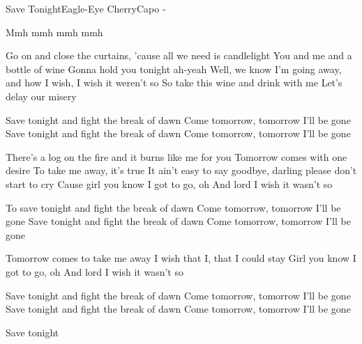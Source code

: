 \begin{song}{Save Tonight}{Eagle-Eye Cherry}{Capo -}

Mmh   mmh   mmh   mmh

Go on and close the curtains,
'cause all we need is candlelight
You and me and a bottle of wine
Gonna hold you tonight ah-yeah
Well, we know I'm going away,
and how I wish, I wish it weren't so
So take this wine and drink with me
Let's delay our misery

Save tonight and fight the break of dawn
Come tomorrow, tomorrow I'll be gone
Save tonight and fight the break of dawn
Come tomorrow, tomorrow I'll be gone

There's a log on the fire
and it burns like me for you
Tomorrow comes with one desire
To take me away, it's true
It ain't easy to say goodbye,
darling please don't start to cry
Cause girl you know I got to go, oh
And lord I wish it wasn't so

To save tonight and fight the break of dawn
Come tomorrow, tomorrow I'll be gone
Save tonight and fight the break of dawn
Come tomorrow, tomorrow I'll be gone


Tomorrow comes to take me away
I wish that I, that I could stay
Girl you know I got to go, oh
And lord I wish it wasn't so

Save tonight and fight the break of dawn
Come tomorrow, tomorrow I'll be gone
Save tonight and fight the break of dawn
Come tomorrow, tomorrow I'll be gone

Save tonight
\end{song}
